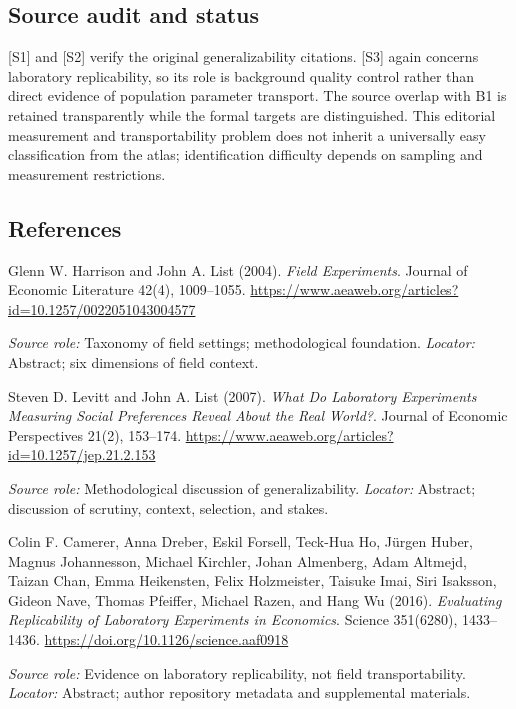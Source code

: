 \documentclass[11pt,a4paper]{article}
\begin{document}
\subsection*{Source audit and status}

[S1] and [S2] verify the original generalizability citations. [S3] again concerns laboratory replicability, so its role is background quality control rather than direct evidence of population parameter transport. The source overlap with B1 is retained transparently while the formal targets are distinguished. This editorial measurement and transportability problem does not inherit a universally easy classification from the atlas; identification difficulty depends on sampling and measurement restrictions.

\subsection*{References}

\begin{enumerate}[label={[S\arabic*]},leftmargin=*]

\item Glenn W. Harrison and John A. List (2004). \emph{Field Experiments}. Journal of Economic Literature 42(4), 1009--1055. \url{https://www.aeaweb.org/articles?id=10.1257/0022051043004577}\par \textit{Source role:} Taxonomy of field settings; methodological foundation. \textit{Locator:} Abstract; six dimensions of field context.

\item Steven D. Levitt and John A. List (2007). \emph{What Do Laboratory Experiments Measuring Social Preferences Reveal About the Real World?}. Journal of Economic Perspectives 21(2), 153--174. \url{https://www.aeaweb.org/articles?id=10.1257/jep.21.2.153}\par \textit{Source role:} Methodological discussion of generalizability. \textit{Locator:} Abstract; discussion of scrutiny, context, selection, and stakes.

\item Colin F. Camerer, Anna Dreber, Eskil Forsell, Teck-Hua Ho, Jürgen Huber, Magnus Johannesson, Michael Kirchler, Johan Almenberg, Adam Altmejd, Taizan Chan, Emma Heikensten, Felix Holzmeister, Taisuke Imai, Siri Isaksson, Gideon Nave, Thomas Pfeiffer, Michael Razen, and Hang Wu (2016). \emph{Evaluating Replicability of Laboratory Experiments in Economics}. Science 351(6280), 1433--1436. \url{https://doi.org/10.1126/science.aaf0918}\par \textit{Source role:} Evidence on laboratory replicability, not field transportability. \textit{Locator:} Abstract; author repository metadata and supplemental materials.

\end{enumerate}
\end{document}
